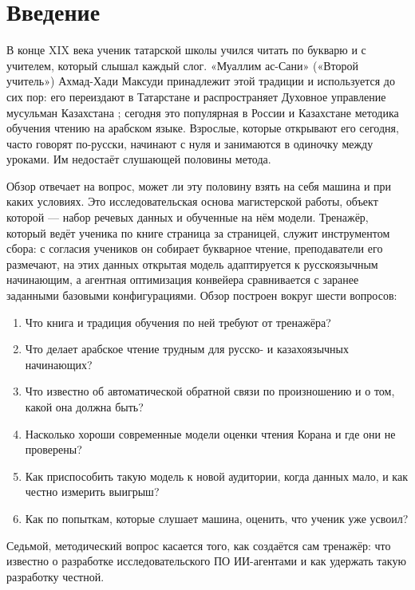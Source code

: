 \documentclass[a4paper,14pt]{extarticle}
\begin{document}
\section{Введение}

В конце XIX века ученик татарской школы учился читать по букварю и с учителем, который слышал каждый
слог. «Муаллим ас-Сани» («Второй учитель») Ахмад-Хади Максуди принадлежит этой традиции и используется
до сих пор: его переиздают в Татарстане и распространяет Духовное управление мусульман Казахстана
\cite{SRC-020,SRC-040}; сегодня это популярная в России и Казахстане методика обучения чтению на арабском языке. Взрослые, которые открывают его сегодня, часто говорят по-русски, начинают с
нуля и занимаются в одиночку между уроками. Им недостаёт слушающей половины метода.

Обзор отвечает на вопрос, может ли эту половину взять на себя машина и при каких условиях. Это
исследовательская основа магистерской работы, объект которой --- набор речевых данных и обученные на нём модели. Тренажёр, который
ведёт ученика по книге страница за страницей, служит инструментом сбора: с согласия учеников он собирает
букварное чтение, преподаватели его размечают, на этих данных открытая модель адаптируется к русскоязычным
начинающим, а агентная оптимизация конвейера сравнивается с заранее заданными базовыми конфигурациями. Обзор построен
вокруг шести вопросов:

\begin{enumerate}[label=\textbf{В\arabic*.}]
  \item Что книга и традиция обучения по ней требуют от тренажёра?
  \item Что делает арабское чтение трудным для русско- и казахоязычных начинающих?
  \item Что известно об автоматической обратной связи по произношению и о том, какой она должна быть?
  \item Насколько хороши современные модели оценки чтения Корана и где они не проверены?
  \item Как приспособить такую модель к новой аудитории, когда данных мало, и как честно измерить выигрыш?
  \item Как по попыткам, которые слушает машина, оценить, что ученик уже усвоил?
\end{enumerate}

Седьмой, методический вопрос касается того, как создаётся сам тренажёр: что известно о разработке
исследовательского ПО ИИ-агентами и как удержать такую разработку честной.
\end{document}
